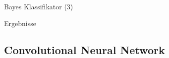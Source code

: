 \documentclass[aspectratio=169]{beamer} %
\begin{document}
\begin{frame}{Bayes Klassifikator (3)}
    \begin{block}{Ergebnisse}
        \begin{figure}
            \centering
            
            \qquad
        \end{figure}
    \end{block}
\end{frame}

\subsection{Convolutional Neural Network}
\end{document}
